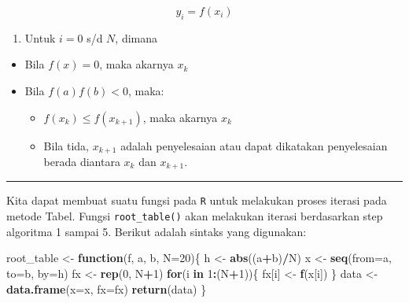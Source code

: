 \documentclass[
]{book}
\newenvironment{Shaded}{\begin{snugshade}}{\end{snugshade}}
\newcommand{\AttributeTok}[1]{\textcolor[rgb]{0.13,0.29,0.53}{#1}}
\newcommand{\ControlFlowTok}[1]{\textcolor[rgb]{0.13,0.29,0.53}{\textbf{#1}}}
\newcommand{\DecValTok}[1]{\textcolor[rgb]{0.00,0.00,0.81}{#1}}
\newcommand{\FunctionTok}[1]{\textcolor[rgb]{0.13,0.29,0.53}{\textbf{#1}}}
\newcommand{\NormalTok}[1]{#1}
\newcommand{\OtherTok}[1]{\textcolor[rgb]{0.56,0.35,0.01}{#1}}
\newcommand{\SpecialCharTok}[1]{\textcolor[rgb]{0.81,0.36,0.00}{\textbf{#1}}}
\providecommand{\tightlist}{%
  \setlength{\itemsep}{0pt}\setlength{\parskip}{0pt}}
\theoremstyle{definition}
\theoremstyle{definition}
\theoremstyle{definition}
\theoremstyle{definition}
\theoremstyle{remark}
\begin{document}
\begin{equation}
y_i=f\left(x_i \right)
  \label{eq:tabel3}
\end{equation}

\begin{enumerate}
\def\labelenumi{\arabic{enumi}.}
\setcounter{enumi}{5}
\tightlist
\item
  Untuk \(i=0\) s/d \(N\), dimana
\end{enumerate}

\begin{itemize}
\item
  Bila \(f\left(x \right)=0\), maka akarnya \(x_k\)
\item
  Bila \(f\left(a \right) f\left(b \right) <0\), maka:

  \begin{itemize}
  \tightlist
  \item
    \(f\left(x_k\right)\le f\left(x_{k+1}\right)\), maka akarnya \(x_k\)
  \item
    Bila tida, \(x_{k+1}\) adalah penyelesaian atau dapat dikatakan penyelesaian berada diantara \(x_k\) dan \(x_{k+1}\).
  \end{itemize}
\end{itemize}

\begin{center}\rule{0.5\linewidth}{0.5pt}\end{center}

Kita dapat membuat suatu fungsi pada \texttt{R} untuk melakukan proses iterasi pada metode Tabel. Fungsi \texttt{root\_table()} akan melakukan iterasi berdasarkan step algoritma 1 sampai 5. Berikut adalah sintaks yang digunakan:

\begin{Shaded}
\begin{Highlighting}[]
\NormalTok{root\_table }\OtherTok{\textless{}{-}} \ControlFlowTok{function}\NormalTok{(f, a, b, }\AttributeTok{N=}\DecValTok{20}\NormalTok{)\{}
\NormalTok{    h }\OtherTok{\textless{}{-}} \FunctionTok{abs}\NormalTok{((a}\SpecialCharTok{+}\NormalTok{b)}\SpecialCharTok{/}\NormalTok{N)}
\NormalTok{    x }\OtherTok{\textless{}{-}} \FunctionTok{seq}\NormalTok{(}\AttributeTok{from=}\NormalTok{a, }\AttributeTok{to=}\NormalTok{b, }\AttributeTok{by=}\NormalTok{h)}
\NormalTok{    fx }\OtherTok{\textless{}{-}} \FunctionTok{rep}\NormalTok{(}\DecValTok{0}\NormalTok{, N}\SpecialCharTok{+}\DecValTok{1}\NormalTok{)}
    \ControlFlowTok{for}\NormalTok{(i }\ControlFlowTok{in} \DecValTok{1}\SpecialCharTok{:}\NormalTok{(N}\SpecialCharTok{+}\DecValTok{1}\NormalTok{))\{}
\NormalTok{      fx[i] }\OtherTok{\textless{}{-}} \FunctionTok{f}\NormalTok{(x[i])}
\NormalTok{    \}}
\NormalTok{    data }\OtherTok{\textless{}{-}} \FunctionTok{data.frame}\NormalTok{(}\AttributeTok{x=}\NormalTok{x, }\AttributeTok{fx=}\NormalTok{fx)}
    \FunctionTok{return}\NormalTok{(data)}
\NormalTok{\}}
\end{Highlighting}
\end{Shaded}
\end{document}
